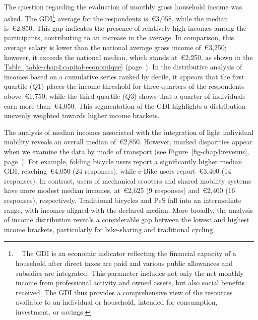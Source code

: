 \begin{refsegment}
The question regarding the evaluation of monthly gross household income was asked. The \acrfull{GDI}\footnote{~
    The \acrfull{GDI} is an economic indicator reflecting the financial capacity of a household after direct taxes are paid and various public allowances and subsidies are integrated. This parameter includes not only the net monthly income from professional activity and owned assets, but also social benefits received. The \acrshort{GDI} thus provides a comprehensive view of the resources available to an individual or household, intended for consumption, investment, or savings.
} average for the respondents is~\euro3,058, while the median is~\euro2,850. This gap indicates the presence of relatively high incomes among the participants, contributing to an increase in the average. In comparison, this average salary is lower than the national average gross income of~\euro3,250; however, it exceeds the national median, which stands at~\euro2,250, as shown in the \hyperref[table-chap4:capital-economique]{Table~\ref{table-chap4:capital-economique}} (page~\pageref{table-chap4:capital-economique}). In the distributive analysis of incomes based on a cumulative series ranked by decile, it appears that the first quartile (\(Q1\)) places the income threshold for three-quarters of the respondents above~\euro1,750, while the third quartile (\(Q3\)) shows that a quarter of individuals earn more than~\euro4,050. This segmentation of the \acrshort{GDI} highlights a distribution unevenly weighted towards higher income brackets.%

The analysis of median incomes associated with the integration of light individual mobility reveals an overall median of~\euro2,850. However, marked disparities appear when we examine the data by mode of transport (see \hyperref[fig-chap4:revenus]{Figure~\ref{fig-chap4:revenus}}, page~\pageref{fig-chap4:revenus}). For example, folding bicycle users report a significantly higher median \acrshort{GDI}, reaching~\euro4,050 (24 responses), while \acrshort{e-Bike} users report~\euro3,400 (14 responses). In contrast, users of mechanical scooters and shared mobility systems have more modest median incomes, at~\euro2,625 (9 responses) and~\euro2,400 (16 responses), respectively. Traditional bicycles and \acrshort{PeS} fall into an intermediate range, with incomes aligned with the declared median. More broadly, the analysis of income distribution reveals a considerable gap between the lowest and highest income brackets, particularly for bike-sharing and traditional cycling.%


\end{refsegment}
